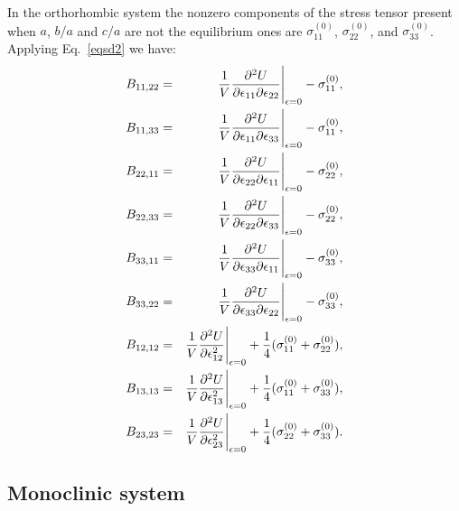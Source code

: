 \documentclass[12pt,a4paper,twoside]{report}
\begin{document}
In the orthorhombic system the nonzero components of the stress tensor 
present when $a$, $b/a$ and $c/a$ are not the equilibrium ones are
$\sigma^{(0)}_{11}$, $\sigma^{(0)}_{22}$, and $\sigma^{(0)}_{33}$.
Applying Eq.~\ref{eqsd2} we have:
\begin{eqnarray}
B_{11,22} &=& {1 \over V}{\partial^2 U \over \partial \epsilon_{11} 
\partial \epsilon_{22}}\Bigg|_{\epsilon=0} - \sigma^{(0)}_{11}, \\
B_{11,33} &=& {1 \over V}{\partial^2 U \over \partial \epsilon_{11} 
\partial \epsilon_{33}}\Bigg|_{\epsilon=0} - \sigma^{(0)}_{11}, \\
B_{22,11} &=& {1 \over V}{\partial^2 U \over \partial \epsilon_{22} 
\partial \epsilon_{11}}\Bigg|_{\epsilon=0} - \sigma^{(0)}_{22}, \\
B_{22,33} &=& {1 \over V}{\partial^2 U \over \partial \epsilon_{22} 
\partial \epsilon_{33}}\Bigg|_{\epsilon=0} - \sigma^{(0)}_{22}, \\
B_{33,11} &=& {1 \over V}{\partial^2 U \over \partial \epsilon_{33} 
\partial \epsilon_{11}}\Bigg|_{\epsilon=0} - \sigma^{(0)}_{33}, \\
B_{33,22} &=& {1 \over V}{\partial^2 U \over \partial \epsilon_{33} 
\partial \epsilon_{22}}\Bigg|_{\epsilon=0} - \sigma^{(0)}_{33}, \\
B_{12,12} &=& {1 \over V}{\partial^2 U \over \partial \epsilon_{12}^2 }\Bigg|_{\epsilon=0} + {1\over 4} (\sigma^{(0)}_{11} +\sigma^{(0)}_{22}), \\
B_{13,13} &=& {1 \over V}{\partial^2 U \over \partial \epsilon_{13}^2}\Bigg|_{\epsilon=0} + {1\over 4} (\sigma^{(0)}_{11}+\sigma^{(0)}_{33}), \\
B_{23,23} &=& {1 \over V}{\partial^2 U \over \partial \epsilon_{23}^2 }\Bigg|_{\epsilon=0} + {1\over 4} (\sigma^{(0)}_{22}+\sigma^{(0)}_{33}).
\end{eqnarray}

{\color{web-blue}\subsection{Monoclinic system}}
\color{black}
\end{document}
